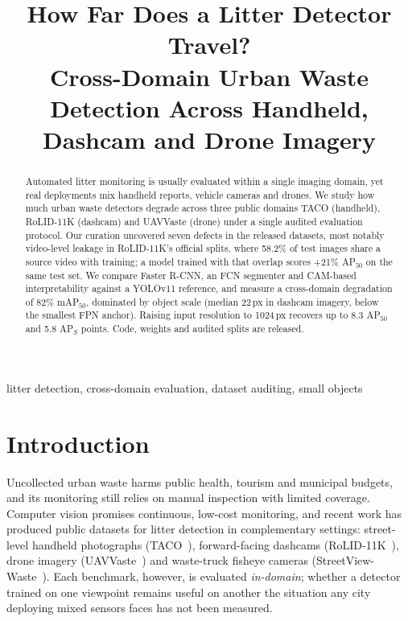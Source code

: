 \documentclass[conference]{IEEEtran}
\begin{document}
\title{How Far Does a Litter Detector Travel?\\
Cross-Domain Urban Waste Detection Across Handheld, Dashcam and Drone Imagery}

\author{
}

\maketitle

\begin{abstract}
Automated litter monitoring is usually evaluated within a single imaging domain,
yet real deployments mix handheld reports, vehicle cameras and drones. We study
how much urban waste detectors degrade across three public domains TACO
(handheld), RoLID-11K (dashcam) and UAVVaste (drone) under a single audited
evaluation protocol. Our curation uncovered seven defects in the released
datasets, most notably video-level leakage in RoLID-11K's official splits, where
58.2\% of test images share a source video with training; a model trained with
that overlap scores +21\% AP$_{50}$ on the same test set. We compare Faster
R-CNN, an FCN segmenter and CAM-based interpretability against a YOLOv11
reference, and measure a cross-domain degradation of 82\% mAP$_{50}$, dominated
by object scale (median 22\,px in dashcam imagery, below the smallest FPN
anchor). Raising input resolution to 1024\,px recovers up to 8.3 AP$_{50}$ and
5.8 AP$_S$ points. Code, weights and audited splits are released.
\end{abstract}

\begin{IEEEkeywords}
litter detection, cross-domain evaluation, dataset auditing, small objects
\end{IEEEkeywords}

\section{Introduction}
Uncollected urban waste harms public health, tourism and municipal budgets, and
its monitoring still relies on manual inspection with limited coverage. Computer
vision promises continuous, low-cost monitoring, and recent work has produced
public datasets for litter detection in complementary settings: street-level
handheld photographs (TACO~\cite{taco}), forward-facing dashcams
(RoLID-11K~\cite{rolid}), drone imagery (UAVVaste~\cite{uavvaste}) and waste-truck
fisheye cameras (StreetView-Waste~\cite{streetview}). Each benchmark, however, is
evaluated \emph{in-domain}; whether a detector trained on one viewpoint remains
useful on another the situation any city deploying mixed sensors faces has
not been measured.
\end{document}
